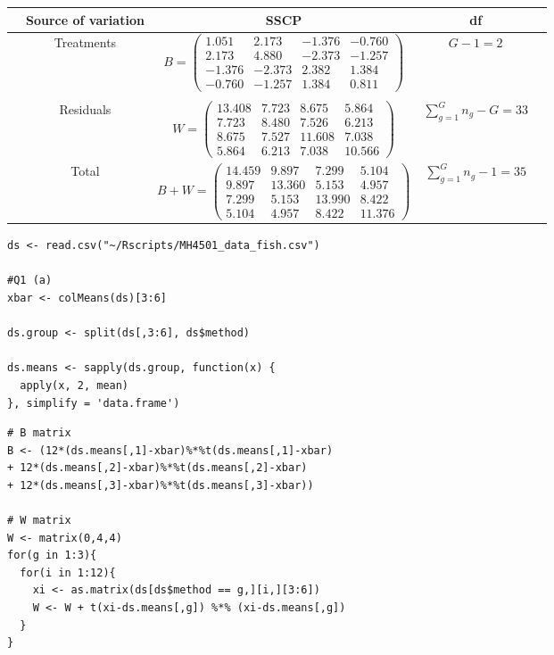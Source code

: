 \documentclass[12pt]{article}
\newenvironment{solution}[2][Solution]{\begin{trivlist}
\item[\hskip \labelsep {\bfseries #1}\hskip \labelsep {\bfseries #2.}]}{\end{trivlist}}
\begin{document}
\begin{solution}[(a) Solution] \\ 
\flushleft{\ }
\begin{center}
  \begin{tabular*}{\textwidth}{@{\extracolsep{\fill}} ccccc @{}} \hline \hline
    & Source of variation & SSCP & df & \\ \hline 
    & Treatments & $B=\left(
    \begin{array}{cccc}
      1.051 & 2.173 & -1.376 & -0.760 \\
      2.173 & 4.880 & -2.373 & -1.257 \\
      -1.376 & -2.373 & 2.382 & 1.384 \\
      -0.760 & -1.257 & 1.384 & 0.811
    \end{array} \right)$ & $G-1=2$  & \\ \\[0.01cm]
    & Residuals & $W=\left(
    \begin{array}{cccc}
      13.408 & 7.723 & 8.675 & 5.864 \\
      7.723 & 8.480 & 7.526 & 6.213 \\
      8.675 & 7.527 & 11.608 & 7.038 \\
      5.864 & 6.213 & 7.038 & 10.566
    \end{array} \right)$ & $\sum_{g=1}^G n_g - G=33$  & \\ \hline
    & Total & $B+W=\left(
    \begin{array}{cccc}
      14.459 & 9.897 & 7.299 & 5.104 \\
      9.897 & 13.360 & 5.153 & 4.957 \\
      7.299 & 5.153 & 13.990 & 8.422 \\
      5.104 & 4.957 & 8.422 & 11.376
    \end{array} \right)$ & $\sum_{g=1}^G n_g - 1=35$  & \\ \hline \hline
  \end{tabular*}
\end{center}

\begin{lstlisting}[caption=R code for Q1 (a)]
ds <- read.csv("~/Rscripts/MH4501_data_fish.csv")

#Q1 (a)
xbar <- colMeans(ds)[3:6]

ds.group <- split(ds[,3:6], ds$method)

ds.means <- sapply(ds.group, function(x) {
  apply(x, 2, mean)
}, simplify = 'data.frame')
\end{lstlisting}

\newpage
\begin{lstlisting}
# B matrix
B <- (12*(ds.means[,1]-xbar)%*%t(ds.means[,1]-xbar)
+ 12*(ds.means[,2]-xbar)%*%t(ds.means[,2]-xbar)
+ 12*(ds.means[,3]-xbar)%*%t(ds.means[,3]-xbar))

# W matrix
W <- matrix(0,4,4)
for(g in 1:3){
  for(i in 1:12){
    xi <- as.matrix(ds[ds$method == g,][i,][3:6])
    W <- W + t(xi-ds.means[,g]) %*% (xi-ds.means[,g])
  }
}
\end{lstlisting}
\end{solution}
\end{document}

